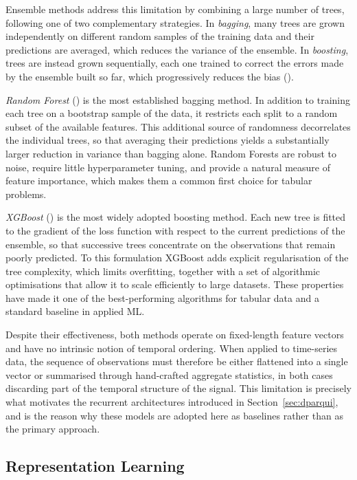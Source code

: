 Ensemble methods address this limitation by combining a large number of trees, following one of two complementary
strategies. In \emph{bagging}, many trees are grown independently on different random samples of the training data
and their predictions are averaged, which reduces the variance of the ensemble. In \emph{boosting}, trees are
instead grown sequentially, each one trained to correct the errors made by the ensemble built so far, which
progressively reduces the bias (\cite{Hastie2009}).

\emph{Random Forest} (\cite{Breiman2001}) is the most established bagging method. In addition to training each
tree on a bootstrap sample of the data, it restricts each split to a random subset of the available features. This
additional source of randomness decorrelates the individual trees, so that averaging their predictions yields a
substantially larger reduction in variance than bagging alone. Random Forests are robust to noise, require little
hyperparameter tuning, and provide a natural measure of feature importance, which makes them a common first choice
for tabular problems.

\emph{XGBoost} (\cite{Chen2016}) is the most widely adopted boosting method. Each new tree is fitted to the
gradient of the loss function with respect to the current predictions of the ensemble, so that successive trees
concentrate on the observations that remain poorly predicted. To this formulation XGBoost adds explicit
regularisation of the tree complexity, which limits overfitting, together with a set of algorithmic optimisations
that allow it to scale efficiently to large datasets. These properties have made it one of the best-performing
algorithms for tabular data and a standard baseline in applied ML.

Despite their effectiveness, both methods operate on fixed-length feature vectors and have no intrinsic notion of
temporal ordering. When applied to time-series data, the sequence of observations must therefore be either
flattened into a single vector or summarised through hand-crafted aggregate statistics, in both cases discarding
part of the temporal structure of the signal. This limitation is precisely what motivates the recurrent
architectures introduced in Section~\ref{sec:dparqui}, and is the reason why these models are adopted here as
baselines rather than as the primary approach.

\subsection{Representation Learning} \label{sec:rep_l}


